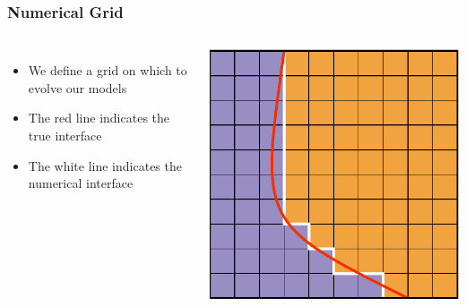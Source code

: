 \documentclass{beamer}
\begin{document}
\begin{frame}
\frametitle{Numerical Grid}
\begin{columns}
\begin{itemize}
\item{We define a grid on which to evolve our models}
\item{The red line indicates the true interface}
\item{The white line indicates the numerical interface}
\end{itemize}
\includegraphics[width=\textwidth]{../images/multimodel_captured.pdf}
\end{columns}
\end{frame}
\end{document}
